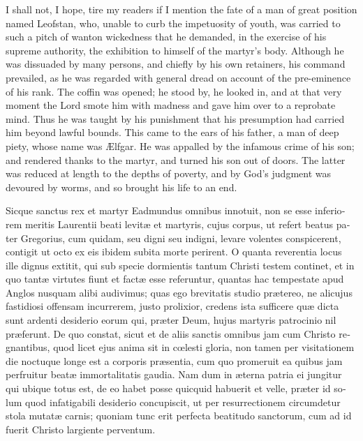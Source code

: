 \documentclass[10pt]{book}
\begin{document}
\begin{paracol}{2}
\switchcolumn

I shall not, I hope, tire my readers if I mention the fate of a man of great position named Leofstan, who, unable to curb the impetuosity of youth, was carried to such a pitch of wanton wickedness that he demanded, in the exercise of his supreme authority, the exhibition to himself of the martyr's body. Although he was dissuaded by many persons, and chiefly by his own retainers, his command prevailed, as he was regarded with general dread on account of the pre-eminence of his rank. The coffin was opened; he stood by, he looked in, and at that very moment the Lord smote him with madness and gave him over to a reprobate mind. Thus he was taught by his punishment that his presumption had carried him beyond lawful bounds. This came to the ears of his father, a man of deep piety, whose name was \AE{}lfgar. He was appalled by the infamous crime of his son; and rendered thanks to the martyr, and turned his son out of doors. The latter was reduced at length to the depths of poverty, and by God's judgment was devoured by worms, and so brought his life to an end.

\switchcolumn*

\begin{otherlanguage}{latin}
Sicque sanctus rex et martyr Eadmundus omnibus innotuit, non se esse inferiorem meritis Laurentii beati levit\ae{} et martyris, cujus corpus, ut refert beatus pater Gregorius, cum quidam, seu digni seu indigni, levare volentes conspicerent, contigit ut octo ex eis ibidem subita morte perirent. O quanta reverentia locus ille dignus extitit, qui sub specie dormientis tantum Christi testem continet, et in quo tant\ae{} virtutes fiunt et fact\ae{} esse referuntur, quantas hac tempestate apud Anglos nusquam alibi audivimus; quas ego brevitatis studio pr\ae{}tereo, ne alicujus fastidiosi offensam incurrerem, justo prolixior, credens ista sufficere qu\ae{} dicta sunt ardenti desiderio eorum qui, pr\ae{}ter Deum, hujus martyris patrocinio nil pr\ae{}ferunt. De quo constat, sicut et de aliis sanctis omnibus jam cum Christo regnantibus, quod licet ejus anima sit in c\oe{}lesti gloria, non tamen per visitationem die noctuque longe est a corporis pr\ae{}sentia, cum quo promeruit ea quibus jam perfruitur beat\ae{} immortalitatis gaudia. Nam dum in \ae{}terna patria ei jungitur qui ubique totus est, de eo habet posse quicquid habuerit et velle, pr\ae{}ter id solum quod infatigabili desiderio concupiscit, ut per resurrectionem circumdetur stola mutat\ae{} carnis; quoniam tunc erit perfecta beatitudo sanctorum, cum ad id fuerit Christo largiente perventum.
\end{otherlanguage}


\end{paracol}
\end{document}
